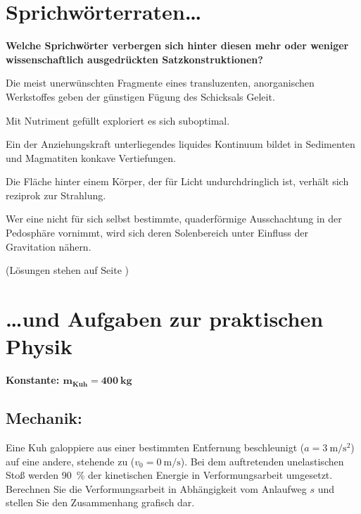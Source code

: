 \section[Sprichwörterraten und Aufgaben zur praktischen Physik]{Sprichwörterraten\dots}
\vspace{-0.5cm}
\textbf{Welche Sprichwörter verbergen sich hinter diesen mehr oder weniger wissenschaftlich ausgedrückten Satzkonstruktionen?}

{\footnotesize
Die meist unerwünschten Fragmente eines transluzenten, anorganischen Werkstoffes geben der günstigen Fügung des Schicksals Geleit.

Mit Nutriment gefüllt exploriert es sich suboptimal.

Ein der Anziehungskraft unterliegendes liquides Kontinuum bildet in Sedimenten und Magmatiten konkave Vertiefungen.

Die Fläche hinter einem Körper, der für Licht undurchdringlich ist, verhält sich reziprok zur Strahlung.

Wer eine nicht für sich selbst bestimmte, quaderförmige Ausschachtung in der Pedosphäre vornimmt, wird sich deren Solenbereich unter Einfluss der Gravitation nähern.

(Lösungen stehen auf Seite \pageref{pg:rätsel_lösungen})\par}
\vspace{-0.8cm}

\vspace{-0.5cm}
\section*{{\dots}und Aufgaben zur praktischen Physik}
\vspace{-0.6cm}
\textbf{Konstante: $\mathbf{m_\text{Kuh} = \SI{400}{\kg}}$}
\vspace{-0.4cm}

\fibelspacingsubsubsection[subsection]

\subsection[Mechanik]{Mechanik:}
Eine Kuh galoppiere aus einer bestimmten Entfernung beschleunigt ($a = \SI{3}{\m\per\s\squared}$) auf eine andere, stehende zu ($v_0 = \SI{0}{\m\per\s}$).
Bei dem auftretenden unelastischen Stoß werden \SI{90}{\percent} der kinetischen Energie in Verformungsarbeit umgesetzt.
Berechnen Sie die Verformungsarbeit in Abhängigkeit vom Anlaufweg $s$ und stellen Sie den Zusammenhang grafisch dar.

